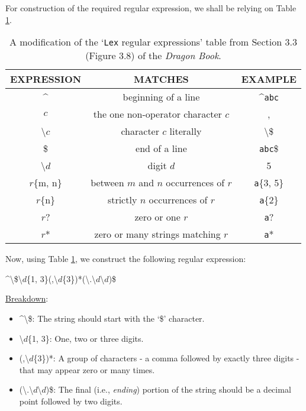 \documentclass[addpoints]{exam}
\begin{document}
\begin{questions}
  \begin{solution}
    For construction of the required regular expression, we shall be relying on Table \ref{tab:Table 1}.
    \begin{table}[H]
      \begin{center}
          \begin{tabular}{ |c|c|c| } 
              \hline
              \hline
              EXPRESSION & MATCHES & EXAMPLE \\ 
              \hline
              \^{} & beginning of a line & \^{}\texttt{abc} \\
              \hline
              \(c\) & the one non-operator character \(c\) & , \\
              \hline
              \textbackslash \(c\) & character \(c\) literally & \textbackslash \$ \\
              \hline 
              \$ & end of a line & \texttt{abc}\$ \\
              \hline
              \textbackslash \(d\) & digit \(d\) & 5 \\
              \hline 
              \(r\)\{m, n\} & between \(m\) and \(n\) occurrences of \(r\) & \texttt{a}\{3, 5\} \\
              \hline
              \(r\)\{n\} & strictly \(n\) occurrences of \(r\) & \texttt{a}\{2\}\\
              \hline
              \(r\)? & zero or one \(r\) & \texttt{a}? \\
              \hline
              \(r\)* & zero or many strings matching \(r\) & \texttt{a}* \\
              \hline
          \end{tabular}
      \end{center}
      \caption{\label{tab:Table 1}A modification of the `\texttt{Lex} regular expressions' table from Section 3.3 (Figure 3.8) of the \textit{Dragon Book}.}
  \end{table}
  Now, using Table \ref{tab:Table 1}, we construct the following regular expression:
  
  \begin{center}
    \^{}\textbackslash\$\textbackslash \(d\)\{1, 3\}(,\textbackslash \(d\)\{3\})*(\textbackslash .\textbackslash \(d\)\textbackslash \(d\))\$
  \end{center}
  
  \underline{Breakdown}:
  \begin{itemize}
    \item \^{}\textbackslash\$: The string should start with the `\$' character.
    \item \textbackslash \(d\)\{1, 3\}: One, two or three digits.
    \item (,\textbackslash \(d\)\{3\})*: A group of characters - a comma followed by exactly three digits - that may appear zero or many times.
    \item (\textbackslash .\textbackslash \(d\)\textbackslash \(d\))\$: The final (i.e., \textit{ending}) portion of the string should be a decimal point followed by two digits.
  \end{itemize}

\end{solution}
\end{questions}
\end{document}
